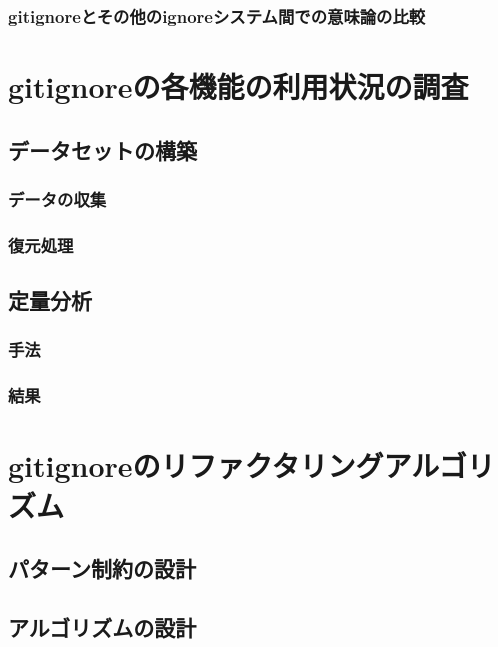 \documentclass[xelatex,ja=standard,fontsize=10.5pt]{bxjsreport}
\begin{document}
\subsection{\textrm{gitignore}とその他の\textrm{ignore}システム間での意味論の比較}

%
\chapter{\textrm{gitignore}の各機能の利用状況の調査}

\section{データセットの構築}

\subsection{データの収集}

\subsection{復元処理}

\section{定量分析}

\subsection{手法}

\subsection{結果}

%
\chapter{\textrm{gitignore}のリファクタリングアルゴリズム}

\section{パターン制約の設計}

\section{アルゴリズムの設計}
\end{document}
